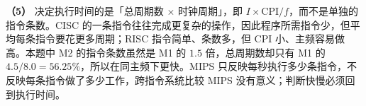 \begin{enumerate}[leftmargin=*]
    \textbf{（5）} 决定执行时间的是「总周期数 $\times$ 时钟周期」，即 $I\times\mathrm{CPI}/f$，而不是单独的指令条数。CISC 的一条指令往往完成更复杂的操作，因此程序所需指令少，但平均每条指令要花更多周期；RISC 指令简单、条数多，但 CPI 小、主频容易做高。本题中 M2 的指令条数虽然是 M1 的 $1.5$ 倍，总周期数却只有 M1 的 $4.5/8.0=56.25\%$，所以在同主频下更快。MIPS 只反映每秒执行多少条指令，不反映每条指令做了多少工作，跨指令系统比较 MIPS 没有意义；判断快慢必须回到执行时间。

    \begin{center}
    \end{center}
    \else \answerarea[10] \fi

\end{enumerate}
